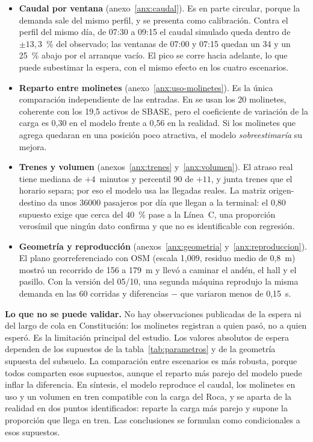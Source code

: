 \begin{itemize}
  \item \textbf{Caudal por ventana} (anexo~\ref{anx:caudal}). Es en parte circular, porque la demanda sale del
        mismo perfil, y se presenta como calibración. Contra el perfil del mismo día, de 07:30 a 09:15 el caudal
        simulado queda dentro de $\pm 13{,}3$~\% del observado; las ventanas de 07:00 y 07:15 quedan un 34 y un
        25~\% abajo por el arranque vacío. El pico se corre hacia adelante, lo que puede subestimar la espera,
        con el mismo efecto en los cuatro escenarios.
  \item \textbf{Reparto entre molinetes} (anexo~\ref{anx:uso-molinetes}). Es la única comparación independiente
        de las entradas. En \EO{} se usan los 20 molinetes, coherente con los 19,5 activos de SBASE, pero el
        coeficiente de variación de la carga es 0,30 en el modelo frente a 0,56 en la realidad. Si los molinetes
        que agrega \EI{} quedaran en una posición poco atractiva, el modelo \emph{sobreestimaría} su mejora.
  \item \textbf{Trenes y volumen} (anexos~\ref{anx:trenes} y~\ref{anx:volumen}). El atraso real tiene mediana de
        $+4$~minutos y percentil 90 de $+11$, y junta trenes que el horario separa; por eso el modelo usa las
        llegadas reales. La matriz origen-destino da unos \num{36000} pasajeros por día que llegan a la terminal:
        el 0,80 supuesto exige que cerca del 40~\% pase a la Línea~C, una proporción verosímil que ningún dato
        confirma y que no es identificable con regresión.
  \item \textbf{Geometría y reproducción} (anexos~\ref{anx:geometria} y~\ref{anx:reproduccion}). El plano
        georreferenciado con OSM (escala 1,009, residuo medio de 0,8~m) mostró un recorrido de 156 a 179~m y llevó
        a caminar el andén, el hall y el pasillo. Con la versión del 05/10, una segunda máquina reprodujo la misma
        demanda en las 60 corridas y diferencias \EI{} $-$ \EO{} que variaron menos de 0,15~s.
\end{itemize}

\textbf{Lo que no se puede validar.} No hay observaciones publicadas de la espera ni del largo de cola en
Constitución: los molinetes registran a quien pasó, no a quien esperó. Es la limitación principal del estudio.
Los valores absolutos de espera dependen de los supuestos de la tabla~\ref{tab:parametros} y de la geometría
supuesta del subsuelo. La comparación entre escenarios es más robusta, porque todos comparten esos supuestos,
aunque el reparto más parejo del modelo puede inflar la diferencia. En síntesis, el modelo reproduce el caudal,
los molinetes en uso y un volumen en tren compatible con la carga del Roca, y se aparta de la realidad en dos
puntos identificados: reparte la carga más parejo y supone la proporción que llega en tren. Las conclusiones se
formulan como condicionales a esos supuestos.
